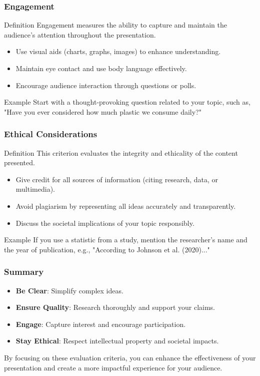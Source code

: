 \documentclass[aspectratio=169]{beamer}
\begin{document}
\begin{frame}[fragile]
    \frametitle{Engagement}
    \begin{block}{Definition}
        Engagement measures the ability to capture and maintain the audience’s attention throughout the presentation.
    \end{block}
    \begin{itemize}
        \item Use visual aids (charts, graphs, images) to enhance understanding.
        \item Maintain eye contact and use body language effectively.
        \item Encourage audience interaction through questions or polls.
    \end{itemize}
    \begin{block}{Example}
        Start with a thought-provoking question related to your topic, such as, 
        "Have you ever considered how much plastic we consume daily?"
    \end{block}
\end{frame}

\begin{frame}[fragile]
    \frametitle{Ethical Considerations}
    \begin{block}{Definition}
        This criterion evaluates the integrity and ethicality of the content presented.
    \end{block}
    \begin{itemize}
        \item Give credit for all sources of information (citing research, data, or multimedia).
        \item Avoid plagiarism by representing all ideas accurately and transparently.
        \item Discuss the societal implications of your topic responsibly.
    \end{itemize}
    \begin{block}{Example}
        If you use a statistic from a study, mention the researcher's name and the year of publication, 
        e.g., "According to Johnson et al. (2020)..."
    \end{block}
\end{frame}

\begin{frame}[fragile]
    \frametitle{Summary}
    \begin{itemize}
        \item \textbf{Be Clear}: Simplify complex ideas.
        \item \textbf{Ensure Quality}: Research thoroughly and support your claims.
        \item \textbf{Engage}: Capture interest and encourage participation.
        \item \textbf{Stay Ethical}: Respect intellectual property and societal impacts.
    \end{itemize}
    By focusing on these evaluation criteria, you can enhance the effectiveness of your presentation and create a more impactful experience for your audience.
\end{frame}
\end{document}
